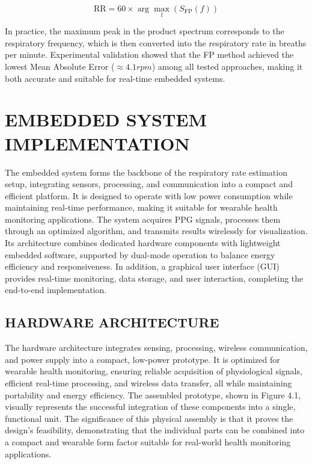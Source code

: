 \documentclass[12pt,a4paper]{report}
\begin{document}
\begin{equation}
\text{RR} = 60 \times \arg\max_{\text{f}} (S_{\text{FP}}(f))
\end{equation}

 In practice, the maximum peak in the product spectrum corresponds to the respiratory frequency, which is then converted into the respiratory rate in breaths per minute. Experimental validation showed that the FP method achieved the lowest Mean Absolute Error ($\approx4.1 rpm$) among all tested approaches, making it both accurate and suitable for real-time embedded systems.\\





\chapter{\Large EMBEDDED SYSTEM IMPLEMENTATION}

 The embedded system forms the backbone of the respiratory rate estimation setup, integrating sensors, processing, and communication into a compact and efficient platform. It is designed to operate with low power consumption while maintaining real-time performance, making it suitable for wearable health monitoring applications. The system acquires PPG signals, processes them through an optimized algorithm, and transmits results wirelessly for visualization. Its architecture combines dedicated hardware components with lightweight embedded software, supported by dual-mode operation to balance energy efficiency and responsiveness. In addition, a graphical user interface (GUI) provides real-time monitoring, data storage, and user interaction, completing the end-to-end implementation.\\

\section{\large{HARDWARE ARCHITECTURE}}

The hardware architecture integrates sensing, processing, wireless communication, and power supply into a compact, low-power prototype\cite{martinez2022wearable}. It is optimized for wearable health monitoring, ensuring reliable acquisition of physiological signals, efficient real-time processing, and wireless data transfer, all while maintaining portability and energy efficiency. The assembled prototype, shown in Figure 4.1, visually represents the successful integration of these components into a single, functional unit. The significance of this physical assembly is that it proves the design's feasibility, demonstrating that the individual parts can be combined into a compact and wearable form factor suitable for real-world health monitoring applications.
\end{document}
